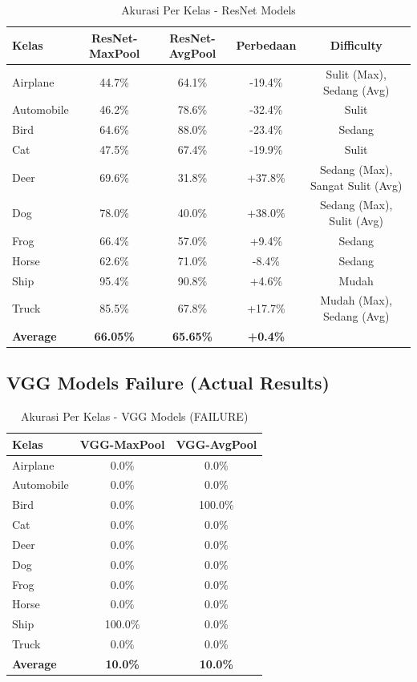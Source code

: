\documentclass[12pt,a4paper]{report}
\begin{document}
\begin{table}[H]
\centering
\caption{Akurasi Per Kelas - ResNet Models}
\begin{tabular}{|l|c|c|c|c|}
\hline
\textbf{Kelas} & \textbf{ResNet-MaxPool} & \textbf{ResNet-AvgPool} & \textbf{Perbedaan} & \textbf{Difficulty} \\
\hline
Airplane & 44.7\% & 64.1\% & -19.4\% & Sulit (Max), Sedang (Avg) \\
\hline
Automobile & 46.2\% & 78.6\% & -32.4\% & Sulit \\
\hline
Bird & 64.6\% & 88.0\% & -23.4\% & Sedang \\
\hline
Cat & 47.5\% & 67.4\% & -19.9\% & Sulit \\
\hline
Deer & 69.6\% & 31.8\% & +37.8\% & Sedang (Max), Sangat Sulit (Avg) \\
\hline
Dog & 78.0\% & 40.0\% & +38.0\% & Sedang (Max), Sulit (Avg) \\
\hline
Frog & 66.4\% & 57.0\% & +9.4\% & Sedang \\
\hline
Horse & 62.6\% & 71.0\% & -8.4\% & Sedang \\
\hline
Ship & 95.4\% & 90.8\% & +4.6\% & Mudah \\
\hline
Truck & 85.5\% & 67.8\% & +17.7\% & Mudah (Max), Sedang (Avg) \\
\hline
\hline
\textbf{Average} & \textbf{66.05\%} & \textbf{65.65\%} & \textbf{+0.4\%} & \\
\hline
\end{tabular}
\end{table}

\subsection{VGG Models Failure (Actual Results)}

\begin{table}[H]
\centering
\caption{Akurasi Per Kelas - VGG Models (FAILURE)}
\begin{tabular}{|l|c|c|}
\hline
\textbf{Kelas} & \textbf{VGG-MaxPool} & \textbf{VGG-AvgPool} \\
\hline
Airplane & 0.0\% & 0.0\% \\
\hline
Automobile & 0.0\% & 0.0\% \\
\hline
Bird & 0.0\% & 100.0\% \\
\hline
Cat & 0.0\% & 0.0\% \\
\hline
Deer & 0.0\% & 0.0\% \\
\hline
Dog & 0.0\% & 0.0\% \\
\hline
Frog & 0.0\% & 0.0\% \\
\hline
Horse & 0.0\% & 0.0\% \\
\hline
Ship & 100.0\% & 0.0\% \\
\hline
Truck & 0.0\% & 0.0\% \\
\hline
\hline
\textbf{Average} & \textbf{10.0\%} & \textbf{10.0\%} \\
\hline
\end{tabular}
\end{table}
\end{document}
